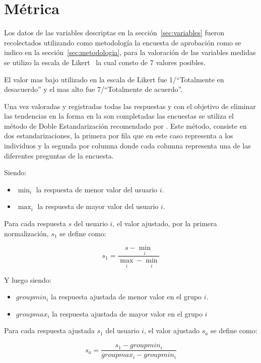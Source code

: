 \section{Métrica}
\label{sec:metrica}

Los datos de las variables descriptas en la sección~\ref{sec:variables} fueron
recolectados utilizando como metodología la encuesta de aprobación como se
indico en la sección~\ref{sec:metodologia}, para la valoración de las variables
medidas se utilizo la escala de Likert~\cite{Allen:2007} la cual consto de 7
valores posibles.

El valor mas bajo utilizado en la escala de Likert fue 1/``Totalmente en
desacuerdo'' y el mas alto fue 7/``Totalmente de acuerdo''.

Una vez valoradas y registradas todas las respuestas y con el objetivo de
eliminar las tendencias en la forma en la son completadas las encuestas
\cite{Fischer2010} se utiliza el método de Doble Estandarización recomendado por
\cite{Pagolu2011}. Este método, consiste en dos estandarizaciones, la primera
por fila que en este caso representa a los individuos y la segunda por columna
donde cada columna representa una de las diferentes preguntas de la encuesta.

Siendo:
\begin{itemize}
	\item $\min_i$ la respuesta de menor valor del usuario $i$.
	\item $\max_i$ la respuesta de mayor valor del usuario $i$.
\end{itemize}

Para cada respuesta $s$ del usuario $i$, el valor ajustado, por la primera 
normalización, $s_1$ se define como:

\begin{equation*}
s_1=\frac{s-\min_i}{\max_i-\min_i}
\end{equation*}

Y luego siendo:
\begin{itemize}
	\item $groupmin_i$ la respuesta ajustada de menor valor en el grupo $i$.
	\item $groupmax_i$ la respuesta ajustada de mayor valor en el grupo $i$
\end{itemize}

Para cada respuesta ajustada $s_1$ del usuario $i$, el valor ajustado $s_a$ se
define como:	

\begin{equation*}
s_a=\frac{s_1-groupmin_i}{groupmax_i-groupmin_i}
\end{equation*}

